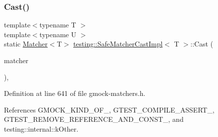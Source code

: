 \subsubsection{\texorpdfstring{Cast()}{Cast()}\hspace{0.1cm}{\footnotesize\ttfamily [2/2]}}
{\footnotesize\ttfamily template$<$typename T $>$ \\
template$<$typename U $>$ \\
static \hyperlink{classtesting_1_1Matcher}{Matcher}$<$T$>$ \hyperlink{classtesting_1_1SafeMatcherCastImpl}{testing\+::\+Safe\+Matcher\+Cast\+Impl}$<$ T $>$\+::Cast (\begin{DoxyParamCaption}\item[{const \hyperlink{classtesting_1_1Matcher}{Matcher}$<$ U $>$ \&}]{matcher }\end{DoxyParamCaption})\hspace{0.3cm}{\ttfamily [inline]}, {\ttfamily [static]}}



Definition at line 641 of file gmock-\/matchers.\+h.



References G\+M\+O\+C\+K\+\_\+\+K\+I\+N\+D\+\_\+\+O\+F\+\_\+, G\+T\+E\+S\+T\+\_\+\+C\+O\+M\+P\+I\+L\+E\+\_\+\+A\+S\+S\+E\+R\+T\+\_\+, G\+T\+E\+S\+T\+\_\+\+R\+E\+M\+O\+V\+E\+\_\+\+R\+E\+F\+E\+R\+E\+N\+C\+E\+\_\+\+A\+N\+D\+\_\+\+C\+O\+N\+S\+T\+\_\+, and testing\+::internal\+::k\+Other.


